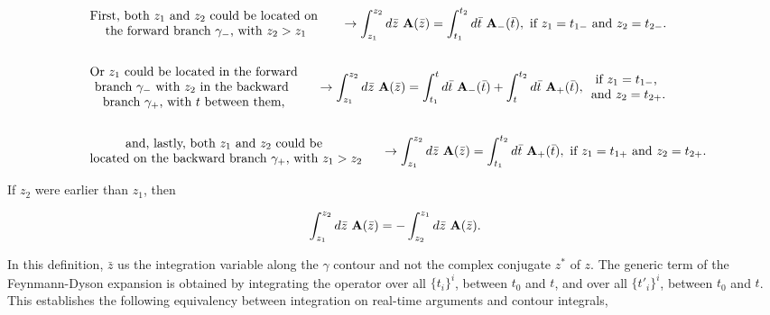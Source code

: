 \begin{equation}
    \begin{split}
        &\begin{array}{cc}
            \textnormal{First, both $z_1$ and $z_2$ could be located on }  \\
            \textnormal{the forward branch $\gamma_-$, with $z_2 > z_1$}
       \end{array} \quad \rightarrow \int_{z_1}^{z_2} d\bar{z} \textnormal{ } {\bf A}(\bar{z}) = \int_{t_1}^{t_2} d\bar{t} \textnormal{ } {\bf A}_{-}(\bar{t}), \textnormal{ if $z_1 = t_{1-}$ and $z_2 = t_{2-}.$}  \\
       \\
       &\begin{array}{cc}
            \textnormal{Or $z_1$ could be located in the forward}  \\
            \textnormal{branch $\gamma_-$ with $z_2$ in the backward } \\
            \textnormal{branch $\gamma_+$, with $t$ between them,}
       \end{array} \quad \rightarrow \int_{z_1}^{z_2} d\bar{z} \textnormal{ } {\bf A}(\bar{z}) = \int_{t_1}^{t} d\bar{t} \textnormal{ } {\bf A}_{-}(\bar{t}) + \int_{t}^{t_2} d\bar{t} \textnormal{ } {\bf A}_{+}(\bar{t}),
       \begin{array}{cc}
            \textnormal{if $z_1 = t_{1-}$, } \\
            \textnormal{and $z_2 = t_{2+}.$}
       \end{array}\\
      \\
       &\begin{array}{cc}
         \textnormal{and, lastly, both $z_1$ and $z_2$ could be }  \\
         \textnormal{located on the backward branch $\gamma_+$, with $z_1 > z_2$} 
       \end{array} \quad \rightarrow \int_{z_1}^{z_2} d\bar{z} \textnormal{ } {\bf A}(\bar{z}) = \int_{t_1}^{t_2} d\bar{t} \textnormal{ } {\bf A}_{+}(\bar{t}), \textnormal{ if $z_1 = t_{1+}$ and $z_2 = t_{2+}.$} 
    \end{split} 
\end{equation}

If $z_2$ were earlier than $z_1$, then 

\[
    \int_{z_1}^{z_2} d\bar{z} \textnormal{ } {\bf A}(\bar{z}) = - \int_{z_2}^{z_1} d\bar{z} \textnormal{ } {\bf A}(\bar{z}).
\]

In this definition, $\bar{z}$ us the integration variable along the $\gamma$ contour and not the complex conjugate $z^{*}$ of $z$.
The generic term of the Feynmann-Dyson expansion is obtained by integrating the operator over all $\{t_i\}^i$, between $t_0$ and $t$, and over all $\{t'_i\}^{i}$, between $t_0$ and $t$.
This establishes the following equivalency between integration on real-time arguments and contour integrals, 

